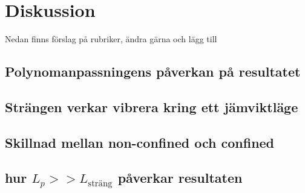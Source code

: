 



\section{Diskussion}

Nedan finns förslag på rubriker, ändra gärna och lägg till

\subsection{Polynomanpassningens påverkan på resultatet}

\subsection{Strängen verkar vibrera kring ett jämviktläge}

\subsection{Skillnad mellan non-confined och confined}

\subsection{hur $L_{p}>>L_\text{sträng}$ påverkar resultaten}


